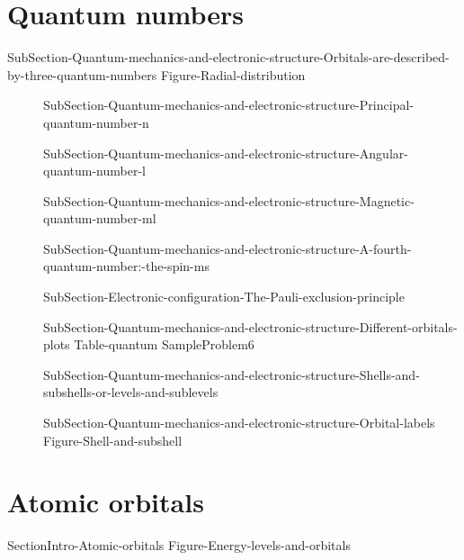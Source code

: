 \documentclass[main.tex]{subfiles}
\newcommand\chapterlabel{Ch-radiation}\setcounter{figurenewcounter}{0}\setcounter{tablenewcounter}{0}\setcounter{formulanewcounter}{0}\chapterpicture{../{\chapterlabel}/figure1}\chapterpicturelabel{PngImg}
\begin{document}
\section{Quantum numbers}{SubSection-Quantum-mechanics-and-electronic-structure-Orbitals-are-described-by-three-quantum-numbers}
 {Figure-Radial-distribution}  
\sloppy\begin{description}
\item[]{SubSection-Quantum-mechanics-and-electronic-structure-Principal-quantum-number-n}
\item[]{SubSection-Quantum-mechanics-and-electronic-structure-Angular-quantum-number-l}
\item[]{SubSection-Quantum-mechanics-and-electronic-structure-Magnetic-quantum-number-ml}
\item[] {SubSection-Quantum-mechanics-and-electronic-structure-A-fourth-quantum-number:-the-spin-ms}
\item[] {SubSection-Electronic-configuration-The-Pauli-exclusion-principle}
\item[]{SubSection-Quantum-mechanics-and-electronic-structure-Different-orbitals-plots}
{Table-quantum}
{SampleProblem6}
\item[] {SubSection-Quantum-mechanics-and-electronic-structure-Shells-and-subshells-or-levels-and-sublevels}
\item[] {SubSection-Quantum-mechanics-and-electronic-structure-Orbital-labels}
 {Figure-Shell-and-subshell}
\end{description}

 

\section{Atomic orbitals}{SectionIntro-Atomic-orbitals} 
{Figure-Energy-levels-and-orbitals}
\end{document}
